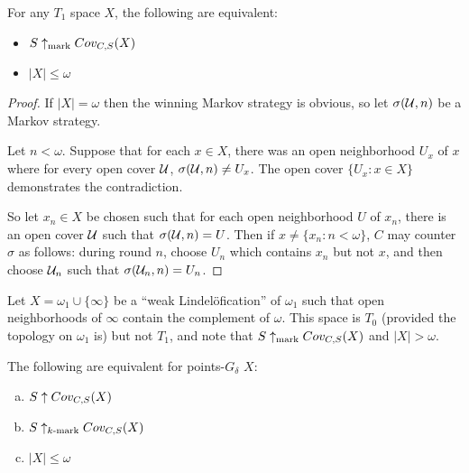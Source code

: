   \begin{theorem}
  For any $T_1$ space $X$, the following are equivalent:
    \begin{itemize}
      \item $S\uparrow_{\text{mark}}Cov_{C,S}(X)$
      \item $|X|\leq\omega$
    \end{itemize}
  \end{theorem}

  \begin{proof}
    If $|X|=\omega$ then the winning Markov strategy is obvious, so let $\sigma(\mathcal{U},n)$ be a Markov strategy.

    Let $n<\omega$. Suppose that for each $x\in X$, there was an open neighborhood $U_x$ of $x$ where for every open cover $\mathcal{U}$, $\sigma(\mathcal{U},n) \not= U_x$. The open cover $\{U_x : x\in X\}$ demonstrates the contradiction.

    So let $x_n\in X$ be chosen such that for each open neighborhood $U$ of $x_n$, there is an open cover $\mathcal{U}$ such that $\sigma(\mathcal{U},n)=U$. Then if $x\not=\{x_n : n<\omega\}$, $C$ may counter $\sigma$ as follows: during round $n$, choose $U_n$ which contains $x_n$ but not $x$, and then choose $\mathcal{U}_n$ such that $\sigma(\mathcal{U}_n,n)=U_n$.
  \end{proof}


  \begin{example}
    Let $X=\omega_1\cup\{\infty\}$ be a ``weak Lindel\"ofication'' of $\omega_1$ such that open neighborhoods of $\infty$ contain the complement of $\omega$. This space is $T_0$ (provided the topology on $\omega_1$ is) but not $T_1$, and note that $S\uparrow_{\text{mark}}Cov_{C,S}(X)$ and $|X|>\omega$.
  \end{example}

  \begin{theorem}
    The following are equivalent for points-$G_\delta$ $X$:
      \begin{enumerate}[(a)]
        \item $S\uparrow Cov_{C,S}(X)$
        \item $S\uparrow_{k\text{-mark}}Cov_{C,S}(X)$
        \item $|X|\leq\omega$
      \end{enumerate}
  \end{theorem}

